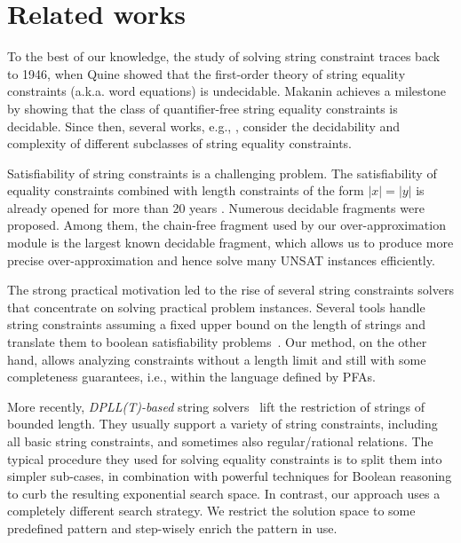 \documentclass[sigplan,review,anonymous]{acmart}\settopmatter{printfolios=true,printccs=false,printacmref=false}
\begin{document}








\section{Related works} 
To the best of our knowledge, the study of solving string constraint traces back to 1946, when Quine \cite{quine1946concatenation} showed that the first-order theory of string equality constraints (a.k.a. word equations) is undecidable. Makanin achieves a milestone \cite{makanin1977problem} by showing that the class of quantifier-free string equality constraints is decidable.
Since then, several works, e.g., \cite{plandowski1999satisfiability,plandowski2006efficient,matiyasevich2008computation,robson1999quadratic,schulz1990makanin,ganesh2012word,ganesh2016undecidability}, consider the decidability and complexity of different subclasses of string equality constraints. 

Satisfiability of string constraints is a challenging problem. The satisfiability of equality constraints combined with length constraints of the form $|x|=|y|$ is already opened for more than 20 years \cite{buchi1990definability}.
Numerous decidable fragments were proposed\cite{abdulla2014string,barcelo2013graph,lin2016string,chen2017decidable,chen2019decision,abdulla2019chain}. Among them, the chain-free fragment \cite{abdulla2019chain} used by our over-approximation module is the largest known decidable fragment, which allows us to produce more precise over-approximation and hence solve many UNSAT instances efficiently.

The strong practical motivation led to the rise of several string constraints solvers that concentrate on solving practical problem instances. Several tools handle string constraints assuming a fixed upper bound on the length of strings and translate them to boolean satisfiability problems~\cite{kiezun2009hampi,saxena2010symbolic,saxena2010flax}.  Our method, on the other hand, allows analyzing constraints without a length limit and still with some completeness guarantees, i.e., within the language defined by PFAs.

More recently,  {\it DPLL(T)-based} string solvers~\cite{berzish2017z3str3,zheng2017z3str2,cvc4Tool,trinh2014s3,trinh2016progressive,abdulla2015norn,abdulla2018trau,sloth,chen2019decision} lift the
restriction of strings of bounded length. They usually support a variety of string constraints, including all basic string constraints, and sometimes also regular/rational relations. 
The typical procedure they used for solving equality constraints is to split them into simpler sub-cases, in combination with powerful techniques for Boolean reasoning to curb the resulting exponential search space. In contrast, our approach uses a completely different search strategy. We restrict the solution space to some predefined pattern and step-wisely enrich the pattern in use.
\end{document}
